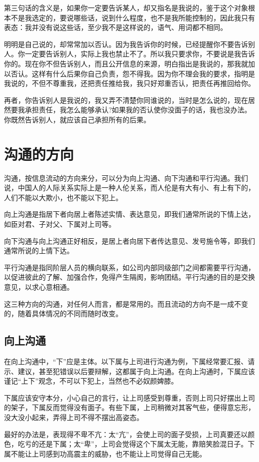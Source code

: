 \documentclass[fontset=fandol, a4paper, 12pt, openright]{ctexbook}
\begin{document}
第三句话的含义是，如果你一定要告诉某人，却又指名是我说的，鉴于这个对象根本不是我选定的，要说哪些话，说到什么程度，也不是我所能控制的，因此我只有表态：我并没有说这些话，至少我不是这样说的，语气、用词都不相同。

明明是自己说的，却常常加以否认。因为我告诉你的时候，已经提醒你不要告诉别人。你一定要告诉别人，实际上我也禁止不了。所以我只要求你，不要说是我告诉你的。现在你不但告诉别人，而且公开信息的来源，明白指出是我说的，那我就加以否认。这样有什么后果你自己负责，怨不得我。因为你不理会我的要求，指明是我说的，不但不尊重我，还把责任推给我，我只好郑重否认，把责任再推回给你。

再者，你告诉别人是我说的，我又弄不清楚你同谁说的，当时是怎么说的，现在居然要我承担责任，我怎么能够承认?如果我的否认使你没面子的话，我也没办法。你既然告诉别人，就应该自己承担所有的后果。


\chapter{沟通的方向}
沟通，按信息流动的方向来分，可以分为向上沟通、向下沟通和平行沟通。我们说，中国人的人际关系实际上是一种人伦关系，而人伦是有大有小、有上有下的，人们不能以大欺小，也不能以下犯上。

向上沟通是指居下者向居上者陈述实情、表达意见，即我们通常所说的下情上达，如臣对君、子对父、下属对上司等。

向下沟通与向上沟通正好相反，是居上者向居下者传达意见、发号施令等，即我们通常所说的上情下达。

平行沟通是指同阶层人员的横向联系，如公司内部同级部门之间都需要平行沟通，以促进彼此的了解、加强合作，免得产生隔阂，影响团结。平行沟通的目的是交换意见，以求心意相通。

这三种方向的沟通，对任何人而言，都是常用的。而且流动的方向不是一成不变的，随着具体情况的不同而随时改变。


\section{向上沟通}

在向上沟通中，“下”应是主体。以下属与上司进行沟通为例，下属经常要汇报、请示、建议，甚至犯错误以后要辩解，这都属于向上沟通。在向上沟通时，下属应该谨记“上下”观念，不可以下犯上，当然也不必奴颜婢膝。

下属应该安守本分，小心自己的言行，让上司感受到尊重，否则上司只好摆出上司的架子，下属反而觉得没有面子。有些下属，上司稍微对其客气些，便得意忘形，没大没小起来，弄得上司不得不摆出高姿态。

最好的办法是，表现得不卑不亢：太“亢”，会使上司的面子受损，上司真要还以颜色，吃亏的还是下属；太“卑”，上司会觉得这个下属太无能，靠赔笑脸混日子。下属不能让上司感到功高震主的威胁，也不能让上司觉得自己无能。
\end{document}
